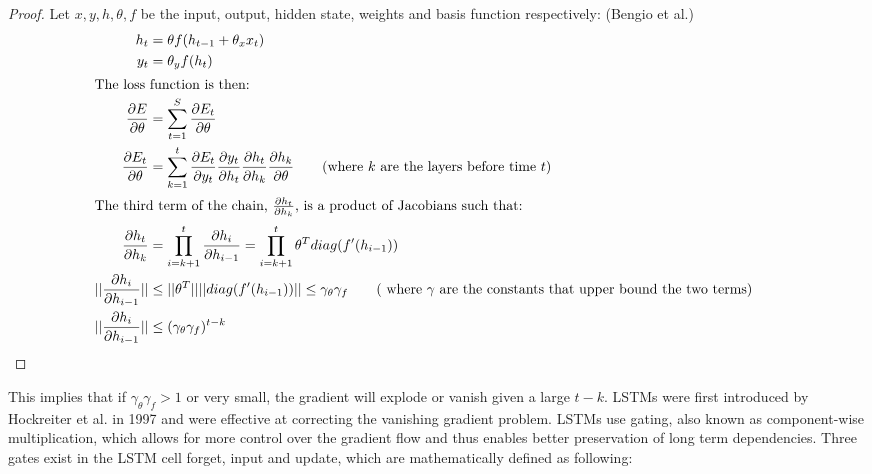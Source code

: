 \documentclass[10pt,onecolumn,letterpaper]{article}
\begin{document}
\begin{proof}\renewcommand{\qedsymbol}{}
Let $x, y, h,  \theta, f $ be the input, output, hidden state, weights and basis function respectively: (Bengio et al.)
	\begin{align*}
    	h_{t} &=  \theta f(h_{t-1}+\theta_{x}x_{t})\\
    	y_{t} &= \theta_{y} f(h_{t}) \\
    	\shortintertext{The loss function is then:} 
    	\frac{\partial E}{\partial \theta} &= \sum_{t=1}^{S} \frac{\partial E_{t}}{\partial \theta} \\
  	\frac{\partial E_{t}}{\partial \theta} &= \sum_{k=1}^{t} \frac{\partial E_{t}}{\partial y_{t}} \frac{\partial  y_{t}}{\partial h_{t}} \frac{\partial h_{t}}{\partial h_{k}} \frac{\partial h_{k}}{\partial \theta} \tag{where $k$ are the layers before time $t$} \\
	\shortintertext{The third term of the chain, $\frac{\partial h_{t}}{\partial h_{k}}$, is a product of Jacobians such that:} 
	\frac{\partial h_{t}}{\partial h_{k}} &= \prod_{i = k+1}^{t} \frac{\partial h_{i}}{\partial h_{i-1}} = \prod_{i = k+1}^{t} \theta^{T}  diag(f'(h_{i-1})) \\
	||\frac{\partial h_{i}}{\partial h_{i-1}}|| & \leq ||\theta^{T}|| ||diag(f'(h_{i-1}))|| \leq \gamma_{\theta}\gamma_{f} \tag{ where $\gamma$ are the constants that upper bound the two terms} \\
	||\frac{\partial h_{i}}{\partial h_{i-1}}|| & \leq  (\gamma_{\theta}\gamma_{f})^{t-k} &&\qedhere \\
 	\end{align*}
\end{proof}
\vskip -0.5cm
This implies that if $\gamma_{\theta}\gamma_{f} > 1$ or very small, the gradient will explode or vanish given a large $t-k$. LSTMs were first introduced by Hockreiter et al.\cite{Hockreiter} in 1997 and were effective at correcting the vanishing gradient problem. LSTMs use gating, also known as component-wise multiplication, which allows for more control over the gradient flow and thus enables better preservation of long term dependencies. Three gates exist in the LSTM cell forget, input and update, which are mathematically defined as following: 
\end{document}

